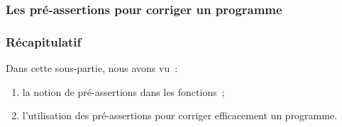 \begin{frame}[fragile] 
    \frametitle{Les pré-assertions pour corriger un programme}
\begin{center}  \end{center}
\end{frame}

\begin{frame}[fragile] \frametitle{Récapitulatif}
Dans cette sous-partie, nous avons vu~:

\begin{enumerate}
    \item la notion de pré-assertions dans les fonctions~;
    \smallskip

    \item l'utilisation des pré-assertions pour corriger efficacement
    un programme.
\end{enumerate}
\end{frame}

